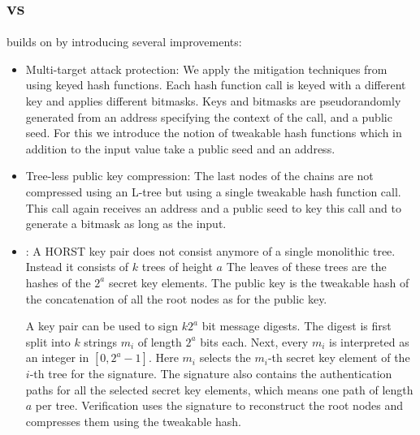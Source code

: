 \subsection{\spx vs \spc} \spx builds on \spc by introducing several improvements:
\begin{itemize}
 \item Multi-target attack protection: We apply the mitigation techniques from
 \cite{Huelsing2016} using keyed hash functions. Each hash function call is
 keyed with a different key and applies different bitmasks. Keys and bitmasks are
 pseudorandomly generated from an address specifying the context of the call, and
 a public seed. For this we introduce the notion of tweakable hash functions
 which in addition to the input value take a public seed and an address.

 \item Tree-less \wotsp public key compression: The last nodes of the \wotsp chains
 are not compressed using an L-tree but using a single tweakable hash function
 call. This call again receives an address and a public seed to key this call and to
 generate a bitmask as long as the input.


 \item \fors: A HORST key pair does not consist anymore of a single
 monolithic tree. Instead it consists of $k$ trees of height $a$ %
 The leaves of these trees are the hashes of the $2^a$ secret key elements. %
 The public key is the tweakable hash of the concatenation of all the root
 nodes as for the \wotsp public key.

 A \fors key pair can be used to sign $k2^a$%
 bit message digests. %
 The digest is first split into $k$ strings $m_i$ of length $2^a$ bits each. %
 Next, every $m_i$ is interpreted as an integer in $[0,2^a -1]$. %
 Here $m_i$ selects the $m_i$-th secret key element of the
 $i$-th tree for the signature. The signature also contains the authentication
 paths for all the selected secret key elements, which means one path of length %
 $a$ per tree. Verification uses the signature to reconstruct the root nodes %
 and compresses them using the tweakable hash.


\end{itemize}
